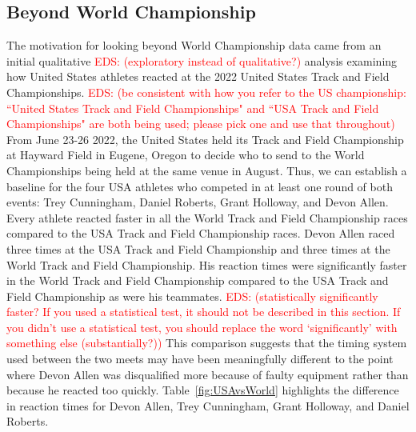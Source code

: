 \documentclass[12pt, letterpaper, titlepage]{article}
\newcommand{\eds}[1]{\textcolor{red}{EDS: (#1)}}
\begin{document}
\subsection{Beyond World Championship}\label{sec:databeyond}
The motivation for looking beyond World Championship data came from an 
initial qualitative \eds{exploratory instead of qualitative?}
analysis examining how United States athletes reacted at the 
2022 United States Track and Field Championships.
\eds{be consistent with how you refer to the US championship:
``United States Track and Field Championships" and ``USA Track and Field 
Championships" are both being used; please pick one and use that throughout}
From June 23-26 2022, the United States held its Track
and Field Championship at Hayward 
Field in Eugene, Oregon to decide who to send to the World Championships 
being held at the same venue in August. %
Thus, we can establish a baseline for the four USA athletes who 
competed in at least one round of both events: Trey Cunningham, Daniel Roberts, 
Grant Holloway, and Devon Allen. Every athlete reacted faster in all the World 
Track and Field Championship races compared to the USA Track and Field 
Championship races. Devon Allen raced three times at the USA Track and
Field Championship and three times at the World Track and Field Championship. 
His reaction times were significantly faster in the World Track and
Field Championship compared to the USA Track and Field Championship as were his
teammates. \eds{statistically significantly faster? If you used a statistical 
test, it should not be described in this section.  If you didn't use a 
statistical test, you should replace the word `significantly' with something 
else (substantially?)} 
This comparison suggests that the timing system used between the two
meets may have been meaningfully different to the point where Devon Allen was
disqualified more because of faulty equipment rather than because he reacted
too quickly.  Table~\ref{fig:USAvsWorld} highlights the difference in reaction 
times for Devon Allen, Trey Cunningham, Grant Holloway, and Daniel Roberts. 
\end{document}
